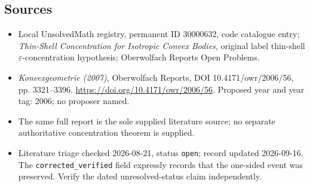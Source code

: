 \documentclass[11pt]{article}
\begin{document}
\subsection{Sources}
\begin{itemize}\item Local UnsolvedMath registry, permanent ID 30000632, code catalogue entry; \emph{Thin-Shell Concentration for Isotropic Convex Bodies}, original label thin-shell \(\varepsilon\)-concentration hypothesis; Oberwolfach Reports Open Problems.\item \emph{Konvexgeometrie (2007)}, Oberwolfach Reports, DOI 10.4171/owr/2006/56, pp. 3321--3396. \url{https://doi.org/10.4171/owr/2006/56}. Proposed year and year tag: 2006; no proposer named.\item The same full report is the sole supplied literature source; no separate authoritative concentration theorem is supplied.\item Literature triage checked 2026-08-21, status \texttt{open}; record updated 2026-09-16. The \texttt{corrected\_verified} field expressly records that the one-sided event was preserved. Verify the dated unresolved-status claim independently.\end{itemize}
\end{document}

